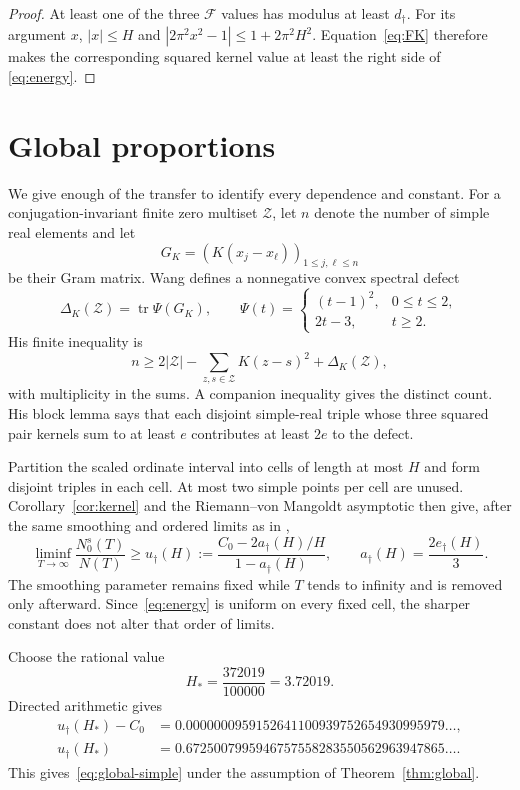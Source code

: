 \documentclass[11pt]{article}
\theoremstyle{remark}
\DeclareMathOperator{\tr}{tr}
\newcommand{\cF}{\mathcal F}
\newcommand{\cZ}{\mathcal Z}
\newcommand{\dsharp}{d_{\dagger}}
\newcommand{\edag}{e_{\dagger}}
\newcommand{\adag}{a_{\dagger}}
\newcommand{\udag}{u_{\dagger}}
\begin{document}
\begin{proof}
At least one of the three $\cF$ values has modulus at least $\dsharp$.  For its
argument $x$, $|x|\le H$ and
$|2\pi^2x^2-1|\le1+2\pi^2H^2$.  Equation~\eqref{eq:FK} therefore makes the
corresponding squared kernel value at least the right side of
\eqref{eq:energy}.
\end{proof}

\section{Global proportions}

We give enough of the transfer to identify every dependence and constant.
For a conjugation-invariant finite zero multiset $\cZ$, let $n$ denote the
number of simple real elements and let
\[
 G_K=(K(x_j-x_\ell))_{1\le j,\ell\le n}
\]
be their Gram matrix.  Wang defines a nonnegative convex spectral defect
\[
 \Delta_K(\cZ)=\tr\Psi(G_K),
 \qquad
 \Psi(t)=
 \begin{cases}
 (t-1)^2,&0\le t\le2,\\
 2t-3,&t\ge2.
 \end{cases}
\]
His finite inequality is
\begin{equation}\label{eq:finite}
 n\ge2|\cZ|-\sum_{z,s\in\cZ}K(z-s)^2+\Delta_K(\cZ),
\end{equation}
with multiplicity in the sums.  A companion inequality gives the distinct
count.  His block lemma says that each disjoint simple-real triple whose
three squared pair kernels sum to at least $e$ contributes at least $2e$ to
the defect.

Partition the scaled ordinate interval into cells of length at most $H$ and
form disjoint triples in each cell.  At most two simple points per cell are
unused.  Corollary~\ref{cor:kernel} and the Riemann--von Mangoldt asymptotic
\cite{Titchmarsh} then give, after the same smoothing and ordered limits as in
\cite{WangGlobal},
\begin{equation}\label{eq:globalformula}
 \liminf_{T\to\infty}\frac{N_0^s(T)}{N(T)}
 \ge\udag(H):=
 \frac{C_0-2\adag(H)/H}{1-\adag(H)},
 \qquad
 \adag(H)=\frac{2\edag(H)}3.
\end{equation}
The smoothing parameter remains fixed while $T$ tends to infinity and is
removed only afterward.  Since~\eqref{eq:energy} is uniform on every fixed
cell, the sharper constant does not alter that order of limits.

Choose the rational value
\begin{equation}\label{eq:Hstar}
 H_*=\frac{372019}{100000}=3.72019.
\end{equation}
Directed arithmetic gives
\begin{align*}
 \udag(H_*)-C_0
 &=0.0000000959152641100939752654930995979\ldots,\\
 \udag(H_*)
 &=0.6725007995946757558283550562963947865\ldots .
\end{align*}
This gives~\eqref{eq:global-simple} under the assumption of Theorem~\ref{thm:global}.
\end{document}
